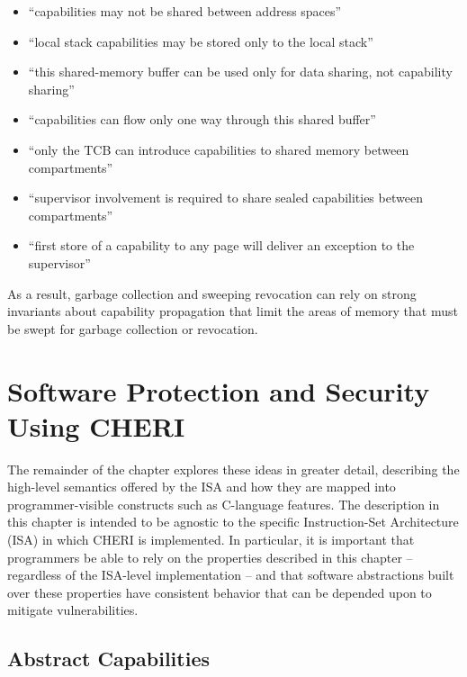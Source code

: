 \begin{itemize}
\item ``capabilities may not be shared between address spaces''
\item ``local stack capabilities may be stored only to the local stack''
\item ``this shared-memory buffer can be used only for data sharing, not
  capability sharing''
\item ``capabilities can flow only one way through this shared buffer''
\item ``only the TCB can introduce capabilities to shared memory between
  compartments''
\item ``supervisor involvement is required to share sealed capabilities
  between compartments''
\item ``first store of a capability to any page will deliver an exception to
  the supervisor''
\end{itemize}

\noindent
As a result, garbage collection and sweeping revocation can rely on strong
invariants about capability propagation that limit the areas of memory that
must be swept for garbage collection or revocation.

\section{Software Protection and Security Using CHERI}
\label{sec:software-protection-using-cheri}

The remainder of the chapter explores these ideas in greater detail,
describing the high-level semantics
 offered
by the ISA and how they are mapped
into programmer-visible constructs such as C-language features.
The description in this chapter is intended to be agnostic to the specific
Instruction-Set Architecture (ISA) in which CHERI is implemented.
In particular, it is important that programmers be able to rely on the
properties described in this chapter -- regardless of the ISA-level
implementation --
and that software abstractions built over these properties have
consistent behavior that can be depended upon to mitigate vulnerabilities.

\subsection{Abstract Capabilities}

